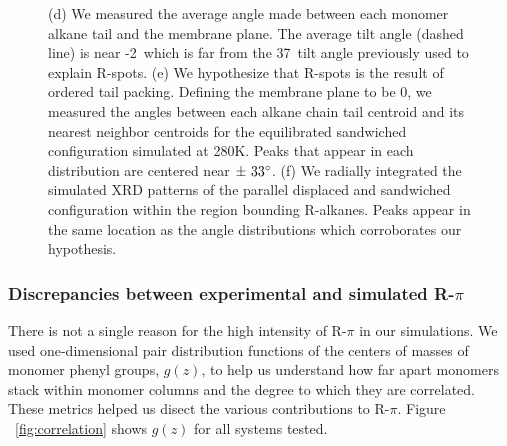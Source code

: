 \documentclass[journal=jpcbfk,manuscript=article]{achemso}
\begin{document}
\begin{figure}[!htb]
{      (d) We measured the average angle made between each monomer alkane tail and
      the membrane plane. The average tilt angle (dashed line) is near -2\degree~which
      is far from the 37\degree~tilt angle previously used to explain R-spots. 
      (e) We hypothesize that R-spots is the result of ordered tail packing. Defining
      the membrane plane to be 0\degree, we measured the angles between each alkane 
      chain tail centroid and its nearest neighbor centroids for the equilibrated 
      sandwiched configuration simulated at 280K. Peaks that appear in each distribution
      are centered near $\pm~33\degree$. (f) We radially integrated the simulated XRD
      patterns of the parallel displaced and sandwiched configuration within the region
      bounding R-alkanes. Peaks appear in the same location as the angle distributions
      which corroborates our hypothesis.}~\label{fig:tail_packing}
  \end{figure}  
  
  \subsubsection{Discrepancies between experimental and simulated R-$\pi$}\label{section:rpi}
  
  There is not a single reason for the high intensity of R-$\pi$ in our simulations.
  We used one-dimensional pair distribution functions of the centers of masses of monomer
  phenyl groups, $g(z)$, to help us understand how far apart monomers stack within monomer 
  columns and the degree to which they are correlated. These metrics helped us disect the 
  various contributions to R-$\pi$. Figure ~\ref{fig:correlation} shows $g(z)$ for all 
  systems tested. 
  
  
  
\end{document}

